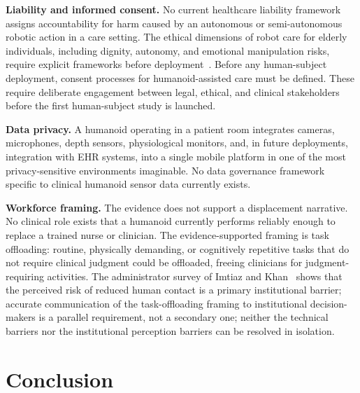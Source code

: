 \documentclass[acmjour]{acmart}
\begin{document}
\textbf{Liability and informed consent.} No current healthcare liability
framework assigns accountability for harm caused by an autonomous or
semi-autonomous robotic action in a care setting. The ethical dimensions of robot
care for elderly individuals, including dignity, autonomy, and emotional
manipulation risks, require explicit frameworks before
deployment~\cite{sharkey2012granny}. Before any human-subject deployment, consent
processes for humanoid-assisted care must be defined. These require deliberate
engagement between legal, ethical, and clinical stakeholders before the first
human-subject study is launched.

\textbf{Data privacy.} A humanoid operating in a patient room integrates cameras,
microphones, depth sensors, physiological monitors, and, in future deployments,
integration with EHR systems, into a single mobile platform in one of the most
privacy-sensitive environments imaginable. No data governance framework specific
to clinical humanoid sensor data currently exists.

\textbf{Workforce framing.} The evidence does not support a displacement
narrative. No clinical role exists that a humanoid currently performs reliably
enough to replace a trained nurse or clinician. The evidence-supported framing is
task offloading: routine, physically demanding, or cognitively repetitive tasks
that do not require clinical judgment could be offloaded, freeing clinicians for
judgment-requiring activities. The administrator survey of Imtiaz and
Khan~\cite{imtiaz2024perceptions} shows that the perceived risk of reduced human
contact is a primary institutional barrier; accurate communication of the
task-offloading framing to institutional decision-makers is a parallel
requirement, not a secondary one; neither the technical barriers nor the
institutional perception barriers can be resolved in isolation.

\section{Conclusion}
\label{sec:conclusion}
\end{document}
